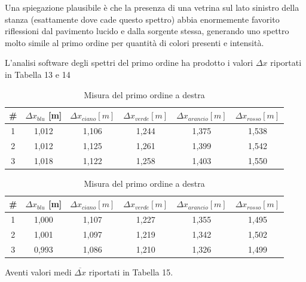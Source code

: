 \documentclass{article}
\begin{document}
\vspace{3mm}

Una spiegazione plausibile è che la presenza di una vetrina sul lato sinistro della stanza (esattamente dove cade questo spettro) abbia enormemente favorito riflessioni dal pavimento lucido e dalla sorgente stessa, generando uno spettro molto simile al primo ordine per quantità di colori presenti e intensità.

\vspace{3mm}

L'analisi software degli spettri del primo ordine ha prodotto i valori $\Delta x$ riportati in Tabella 13 e 14

\begin{table}[h]
    \centering
    \begin{tabular}{||c|c|c|c|c|c||}
        \hline
        \# & \cellcolor{blue}$\Delta x_{blu}$ [m] & \cellcolor{cyan}$\Delta x_{ciano}[m]$ & \cellcolor{green}$\Delta x_{verde}[m]$ & \cellcolor{orange}$\Delta x_{arancio}[m]$ & \cellcolor{red}$\Delta x_{rosso}[m]$ \\
        \hline
        1 & 1,012 & 1,106 & 1,244 & 1,375 & 1,538 \\
        2 & 1,012 & 1,125 & 1,261 & 1,399 & 1,542 \\
        3 & 1,018 & 1,122 & 1,258 & 1,403 & 1,550 \\
        \hline
    \end{tabular}
    \caption{Misura del primo ordine a sinistra}
\centering
\begin{tabular}{||c|c|c|c|c|c||}
    \hline
    \# & \cellcolor{blue}$\Delta x_{blu}$ [m] & \cellcolor{cyan}$\Delta x_{ciano}[m]$ & \cellcolor{green}$\Delta x_{verde}[m]$ & \cellcolor{orange}$\Delta x_{arancio}[m]$ & \cellcolor{red}$\Delta x_{rosso}[m]$ \\
    \hline
    1 & 1,000 & 1,107 & 1,227 & 1,355 & 1,495 \\
    2 & 1,001 & 1,097 & 1,219 & 1,342 & 1,502\\
    3 & 0,993 & 1,086 & 1,210 & 1,326 & 1,499 \\
    \hline
\end{tabular}
\caption{Misura del primo ordine a destra}
\end{table}

Aventi valori medi $\overline{\Delta x}$ riportati in Tabella 15.
\end{document}
